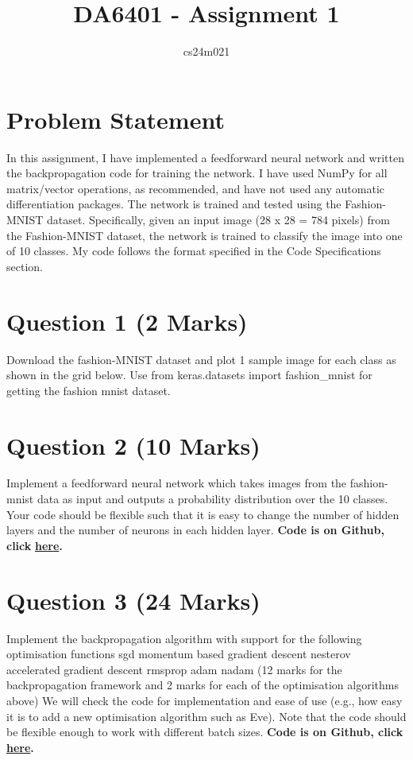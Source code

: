 \documentclass{article}
\title{DA6401 - Assignment 1}
\author{%
cs24m021
}
\begin{document}
\maketitle

\section{Problem Statement}
In this assignment, I have implemented a feedforward neural network and written the backpropagation code for training the network. I have used NumPy for all matrix/vector operations, as recommended, and have not used any automatic differentiation packages. The network is trained and tested using the Fashion-MNIST dataset. Specifically, given an input image (28 x 28 = 784 pixels) from the Fashion-MNIST dataset, the network is trained to classify the image into one of 10 classes. My code follows the format specified in the Code Specifications section.

\section{Question 1 (2 Marks)}
Download the fashion-MNIST dataset and plot 1 sample image for each class as shown in the grid below. Use from keras.datasets import fashion_mnist for getting the fashion mnist dataset.
\section{Question 2 (10 Marks)}
Implement a feedforward neural network which takes images from the fashion-mnist data as input and outputs a probability distribution over the 10 classes.
Your code should be flexible such that it is easy to change the number of hidden layers and the number of neurons in each hidden layer.
\textbf{Code is on Github, click }\href{https://github.com/karan757527/DA6401_Assignment1/blob/main/questions/Question2.py}{\textbf{here}}\textbf{.}

\section{Question 3 (24 Marks)}
Implement the backpropagation algorithm with support for the following optimisation functions 
sgd
momentum based gradient descent
nesterov accelerated gradient descent
rmsprop
adam
nadam
(12 marks for the backpropagation framework and 2 marks for each of the optimisation algorithms above)
We will check the code for implementation and ease of use (e.g., how easy it is to add a new optimisation algorithm such as Eve). Note that the code should be flexible enough to work with different batch sizes.
\textbf{Code is on Github, click }\href{https://github.com/karan757527/DA6401_Assignment1/blob/main/questions/Question3.py}{\textbf{here}}\textbf{.}
\end{document}
